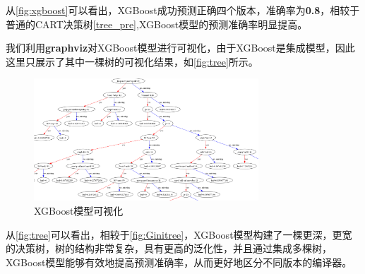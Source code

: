 从\autoref{fig:xgboost}可以看出，XGBoost成功预测正确四个版本，准确率为\textbf{0.8}，相较于普通的CART决策树\autoref{tree_pre},XGBoost模型的预测准确率明显提高。
\par
我们利用\textbf{graphviz}对XGBoost模型进行可视化，由于XGBoost是集成模型，因此这里只展示了其中一棵树的可视化结果，如\autoref{fig:tree}所示。
\begin{figure}[H]
	\centering
	\includegraphics[width=0.75\textwidth]{figures/tree.png}
	\caption{XGBoost模型可视化}
	\label{fig:tree}
\end{figure}
从\autoref{fig:tree}可以看出，相较于\autoref{fig:Ginitree}，XGBoost模型构建了一棵更深，更宽的决策树，树的结构非常复杂，具有更高的泛化性，并且通过集成多棵树，XGBoost模型能够有效地提高预测准确率，从而更好地区分不同版本的编译器。